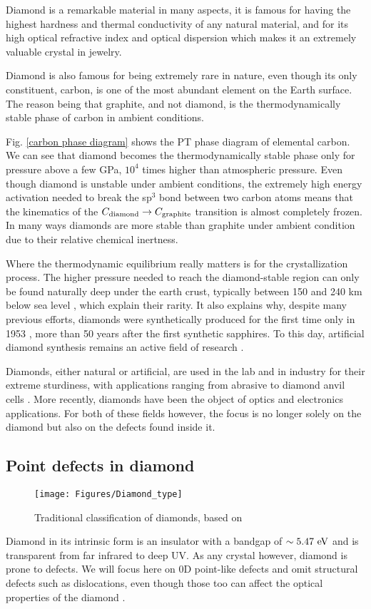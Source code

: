 \documentclass[a4paper,11pt]{report}
\begin{document}
Diamond is a remarkable material in many aspects, it is famous for having the highest hardness and thermal conductivity of any natural material, and for its high optical refractive index and optical dispersion which makes it an extremely valuable crystal in jewelry.

Diamond is also famous for being extremely rare in nature, even though its only constituent, carbon, is one of the most abundant element on the Earth surface. The reason being that graphite, and not diamond, is the thermodynamically stable phase of carbon in ambient conditions.

Fig. \ref{carbon phase diagram} shows the PT phase diagram of elemental carbon. We can see that diamond becomes the thermodynamically stable phase only for pressure above a few GPa, $10^4$ times higher than atmospheric pressure. Even though diamond is unstable under ambient conditions, the extremely high energy activation needed to break the sp$^3$ bond between two carbon atoms means that the kinematics of the $C_{\rm diamond} \to C_{\rm graphite}$ transition is almost completely frozen. In many ways diamonds are more stable than graphite under ambient condition due to their relative chemical inertness.

Where the thermodynamic equilibrium really matters is for the crystallization process. The higher pressure needed to reach the diamond-stable region can only be found naturally deep under the earth crust, typically between 150 and 240 km below sea level \citep{tappert2011diamonds}, which explain their rarity. It also explains why, despite many previous efforts, diamonds were synthetically produced for the first time only in 1953 \citep{barnard2000diamond}, more than 50 years after the first synthetic sapphires. To this day, artificial diamond synthesis remains an active field of research \citep{shenderova2019synthesis, achard2020chemical}.

Diamonds, either natural or artificial, are used in the lab and in industry for their extreme sturdiness, with applications ranging from abrasive to diamond anvil cells \citep{jayaraman1983diamond}. More recently, diamonds have been the object of optics and electronics applications. For both of these fields however, the focus is no longer solely on the diamond but also on the defects found inside it.

\subsection{Point defects in diamond}
\begin{figure}[h!]
\centering
\texttt{[image: Figures/Diamond\_type]}
\caption{Traditional classification of diamonds, based on \citep{tappert2011diamonds}}
\label{diamond type}
\end{figure}
Diamond in its intrinsic form is an insulator with a bandgap of $\sim 5.47\ \rm eV$ and is transparent from far infrared to deep UV. As any crystal however, diamond is prone to defects. We will focus here on 0D point-like defects and omit structural defects such as dislocations, even though those too can affect the optical properties of the diamond \citep{collins2000colour}. 
\end{document}
